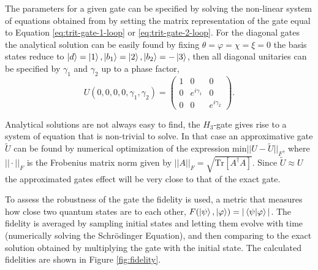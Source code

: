 The parameters for a given gate can be specified by solving the non-linear system of equations obtained from by setting the matrix representation of the gate equal to Equation \ref{eq:trit-gate-1-loop} or \ref{eq:trit-gate-2-loop}. For the diagonal gates the analytical solution can be easily found by fixing $\theta = \varphi = \chi = \xi = 0$ the basis states reduce to $\ket{d} = \ket{1}, \ket{b_1} = \ket{2}, \ket{b_2} = -\ket{3}$, then all diagonal unitaries can be specified by $\gamma_1$ and $\gamma_2$ up to a phase factor,
\begin{equation}
U(0,0,0,0,\gamma_1,\gamma_2) = \begin{pmatrix}
1&0&0
\\
0&e^{i\gamma_1}&0
\\
0&0&e^{i\gamma_2}
\end{pmatrix}.
\end{equation}

Analytical solutions are not always easy to find, the $H_3$-gate gives rise to a system of equation that is non-trivial to solve. In that case an approximative gate $\tilde{U}$ can be found by numerical optimization of the expression $\text{min}||U-\tilde{U}||_F$, where $||\cdot||_F$ is the Frobenius matrix  norm given by $||A||_F = \sqrt{\text{Tr}\left[A^\dagger A \right]}$. Since $\tilde{U} \approx U$ the approximated gates effect will be very close to that of the exact gate.

To assess the robustness of the gate the fidelity is used, a metric that measures how close two quantum states are to each other, $F(\ket{\psi},\ket{\varphi}) = |\bra{\psi}\ket{\varphi}|$. The fidelity is averaged by sampling initial states and letting them evolve  with time (numerically solving the Schrödinger Equation), and then comparing to the exact solution obtained by multiplying the gate with the initial state. The calculated fidelities are shown in Figure \ref{fig:fidelity}. 

